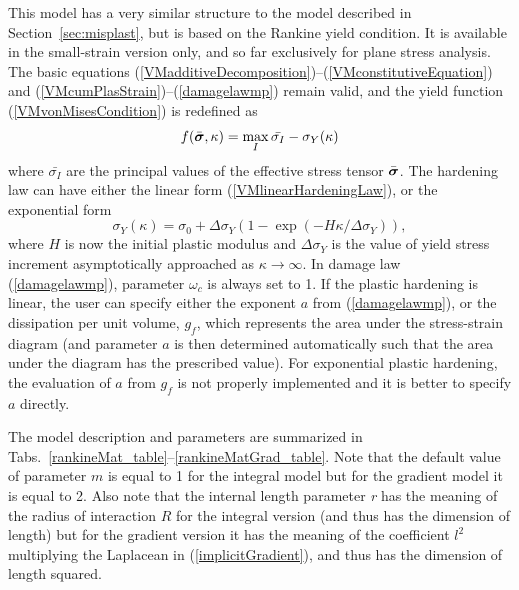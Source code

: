 \documentclass[a4paper]{article}
\newcommand{\mbf}[1]{\mbox{\boldmath$#1$}}
\newcommand{\param}[1]{{\it #1}}
\newcommand{\vsig}{\mbf{\sigma}}%
\begin{document}
This model has a very similar structure to the model described in Section~\ref{sec:misplast},
but is based on the Rankine yield condition. It is available in the small-strain version
only, and so far exclusively for plane stress analysis. 
The basic equations (\ref{VMadditiveDecomposition})--(\ref{VMconstitutiveEquation}) 
and (\ref{VMcumPlasStrain})--(\ref{damagelawmp}) remain valid, 
and the yield function (\ref{VMvonMisesCondition}) is redefined as
\begin{equation}\label{RankineCondition}
f(\bar{\vsig},\kappa) = \max_{I}\bar{\sigma_I}-\sigma_Y(\kappa)
\end{equation}
where $\bar{\sigma_I}$ are the principal values of the effective stress tensor $\bar{\vsig}$.
The hardening law can have either the linear form (\ref{VMlinearHardeningLaw}), or the exponential form
\begin{equation}\label{VMexpHardeningLaw}
\sigma_Y(\kappa) = \sigma_0 + \Delta\sigma_Y\left(1-\exp(-H\kappa/\Delta\sigma_Y)\right),
\end{equation}
where $H$ is now the initial plastic modulus and $\Delta\sigma_Y$ is the value of yield stress
increment asymptotically approached as $\kappa\rightarrow\infty$.
In damage law (\ref{damagelawmp}), parameter $\omega_c$ is always set to 1.
If the plastic hardening is linear, the user can specify either the exponent $a$ from (\ref{damagelawmp}),
or the dissipation per unit volume, $g_f$, which represents the area under the
stress-strain diagram (and parameter $a$ is then determined automatically such that
the area under the diagram has the prescribed value).
For exponential plastic hardening, the evaluation of $a$ from $g_f$ is not properly
implemented and it is better to specify $a$ directly.

The model description and parameters are summarized in Tabs.~\ref{rankineMat_table}--\ref{rankineMatGrad_table}. Note that the default value of parameter $m$ is equal to 1 for the
integral model but for the gradient model it is equal to 2. 
Also note that the internal length parameter \param{r} has the meaning of the
radius of interaction $R$ for the integral version (and thus has the dimension
of length) but for the gradient version it has the meaning of the coefficient $l^2$
multiplying the Laplacean in (\ref{implicitGradient}), and thus has the dimension of length squared.
\end{document}
